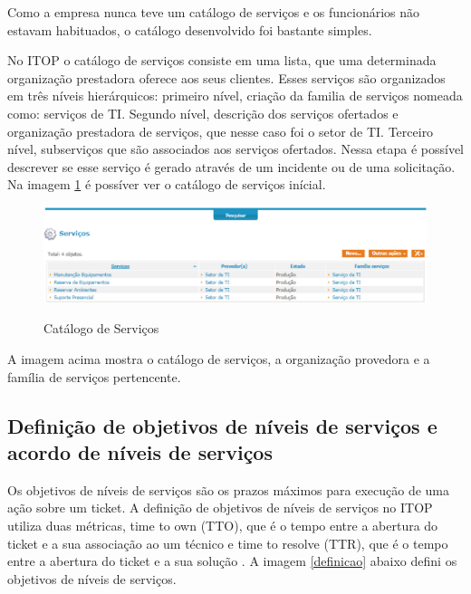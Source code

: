 \documentclass[eso]{bcc}
\begin{document}
Como a empresa nunca teve um catálogo de serviços e os funcionários não estavam habituados, o catálogo desenvolvido foi bastante simples. 

No ITOP o catálogo de serviços consiste em uma lista, que uma determinada organização prestadora oferece aos seus clientes. Esses serviços são organizados em três níveis hierárquicos: primeiro nível, criação da familia de serviços  nomeada como: serviços de TI. Segundo nível, descrição  dos serviços ofertados e organização prestadora de serviços, que nesse caso foi o setor de TI. Terceiro nível, subserviços que são associados aos serviços ofertados. Nessa etapa é possível descrever se esse serviço é gerado através de um incidente ou de uma solicitação. Na imagem \ref{catalogo} é possíver ver o catálogo de serviços inícial.

\newpage

\begin{figure}[!h]
\centering
\caption[Catálogo de serviços]{Catálogo de Serviços}
\includegraphics[scale=0.9]{Figuras/itop2.png}
\label{catalogo}
\end{figure}

A imagem acima mostra o catálogo de serviços, a organização provedora e a família de serviços pertencente.

\subsection{Definição de objetivos de níveis de serviços  e acordo de níveis de serviços}

Os objetivos de níveis de serviços são os prazos máximos para execução de uma ação sobre um ticket.  A definição de objetivos de níveis de serviços no ITOP utiliza duas métricas, time to own (TTO), que é o tempo entre a abertura do ticket e a sua associação ao um técnico e time to resolve (TTR), que  é o tempo entre a abertura do ticket e a sua solução . A imagem \ref{definicao} abaixo defini os objetivos de níveis de serviços.

\newpage
\end{document}
